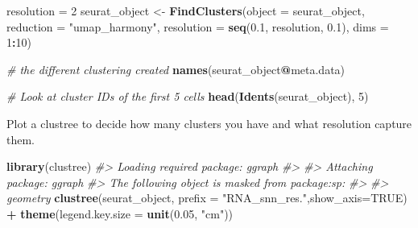 \documentclass[
]{book}
\newenvironment{Shaded}{\begin{snugshade}}{\end{snugshade}}
\newcommand{\AttributeTok}[1]{\textcolor[rgb]{0.13,0.29,0.53}{#1}}
\newcommand{\CommentTok}[1]{\textcolor[rgb]{0.56,0.35,0.01}{\textit{#1}}}
\newcommand{\ConstantTok}[1]{\textcolor[rgb]{0.56,0.35,0.01}{#1}}
\newcommand{\DecValTok}[1]{\textcolor[rgb]{0.00,0.00,0.81}{#1}}
\newcommand{\FloatTok}[1]{\textcolor[rgb]{0.00,0.00,0.81}{#1}}
\newcommand{\FunctionTok}[1]{\textcolor[rgb]{0.13,0.29,0.53}{\textbf{#1}}}
\newcommand{\NormalTok}[1]{#1}
\newcommand{\OtherTok}[1]{\textcolor[rgb]{0.56,0.35,0.01}{#1}}
\newcommand{\SpecialCharTok}[1]{\textcolor[rgb]{0.81,0.36,0.00}{\textbf{#1}}}
\newcommand{\StringTok}[1]{\textcolor[rgb]{0.31,0.60,0.02}{#1}}
\begin{document}
\begin{Shaded}
\begin{Highlighting}[]
\NormalTok{resolution }\OtherTok{=} \DecValTok{2}
\NormalTok{seurat\_object }\OtherTok{\textless{}{-}} \FunctionTok{FindClusters}\NormalTok{(}\AttributeTok{object =}\NormalTok{ seurat\_object, }\AttributeTok{reduction =} \StringTok{"umap\_harmony"}\NormalTok{, }\AttributeTok{resolution =} \FunctionTok{seq}\NormalTok{(}\FloatTok{0.1}\NormalTok{, resolution, }\FloatTok{0.1}\NormalTok{),}
    \AttributeTok{dims =} \DecValTok{1}\SpecialCharTok{:}\DecValTok{10}\NormalTok{)}

\CommentTok{\# the different clustering created}
\FunctionTok{names}\NormalTok{(seurat\_object}\SpecialCharTok{@}\NormalTok{meta.data)}

\CommentTok{\# Look at cluster IDs of the first 5 cells}
\FunctionTok{head}\NormalTok{(}\FunctionTok{Idents}\NormalTok{(seurat\_object), }\DecValTok{5}\NormalTok{)}
\end{Highlighting}
\end{Shaded}

Plot a clustree to decide how many clusters you have and what resolution capture them.

\begin{Shaded}
\begin{Highlighting}[]
\FunctionTok{library}\NormalTok{(clustree)}
\CommentTok{\#\textgreater{} Loading required package: ggraph}
\CommentTok{\#\textgreater{} }
\CommentTok{\#\textgreater{} Attaching package: \textquotesingle{}ggraph\textquotesingle{}}
\CommentTok{\#\textgreater{} The following object is masked from \textquotesingle{}package:sp\textquotesingle{}:}
\CommentTok{\#\textgreater{} }
\CommentTok{\#\textgreater{}     geometry}
\FunctionTok{clustree}\NormalTok{(seurat\_object, }\AttributeTok{prefix =} \StringTok{"RNA\_snn\_res."}\NormalTok{,}\AttributeTok{show\_axis=}\ConstantTok{TRUE}\NormalTok{) }\SpecialCharTok{+} \FunctionTok{theme}\NormalTok{(}\AttributeTok{legend.key.size =} \FunctionTok{unit}\NormalTok{(}\FloatTok{0.05}\NormalTok{, }\StringTok{"cm"}\NormalTok{))}
\end{Highlighting}
\end{Shaded}
\end{document}
